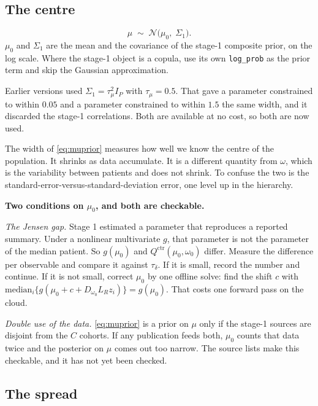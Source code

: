 \documentclass[11pt]{article}
\newcommand{\Ncal}{\mathcal{N}}
\newcommand{\ctr}{\mathrm{ctr}}
\begin{document}
\subsection{The centre}
\label{sec:centre}

\begin{equation}
\mu \;\sim\; \Ncal\big(\mu_0,\;\Sigma_1\big).
\label{eq:muprior}
\end{equation}
$\mu_0$ and $\Sigma_1$ are the mean and the covariance of the stage-1 composite
prior, on the log scale. Where the stage-1 object is a copula, use its own
\texttt{log\_prob} as the prior term and skip the Gaussian approximation.

Earlier versions used $\Sigma_1=\tau_\mu^2 I_P$ with $\tau_\mu=0.5$. That gave a
parameter constrained to within $0.05$ and a parameter constrained to within
$1.5$ the same width, and it discarded the stage-1 correlations. Both are
available at no cost, so both are now used.

The width of \eqref{eq:muprior} measures how well we know the centre of the
population. It shrinks as data accumulate. It is a different quantity from
$\omega$, which is the variability between patients and does not shrink. To
confuse the two is the standard-error-versus-standard-deviation error, one level
up in the hierarchy.

\begin{assumpbox}
\textbf{Two conditions on $\mu_0$, and both are checkable.}

\emph{The Jensen gap.} Stage 1 estimated a parameter that reproduces a reported
summary. Under a nonlinear multivariate $g$, that parameter is not the parameter
of the median patient. So $g(\mu_0)$ and $Q^\ctr(\mu_0,\omega_0)$ differ.
Measure the difference per observable and compare it against $\tau_\delta$. If
it is small, record the number and continue. If it is not small, correct $\mu_0$
by one offline solve: find the shift $c$ with
$\mathrm{median}_i\{g(\mu_0+c+D_{\omega_0}L_R z_i)\}=g(\mu_0)$. That costs one
forward pass on the cloud.

\emph{Double use of the data.} \eqref{eq:muprior} is a prior on $\mu$ only if the
stage-1 sources are disjoint from the $C$ cohorts. If any publication feeds both,
$\mu_0$ counts that data twice and the posterior on $\mu$ comes out too narrow.
The source lists make this checkable, and it has not yet been checked.
\end{assumpbox}

\subsection{The spread}
\label{sec:spread}
\end{document}
